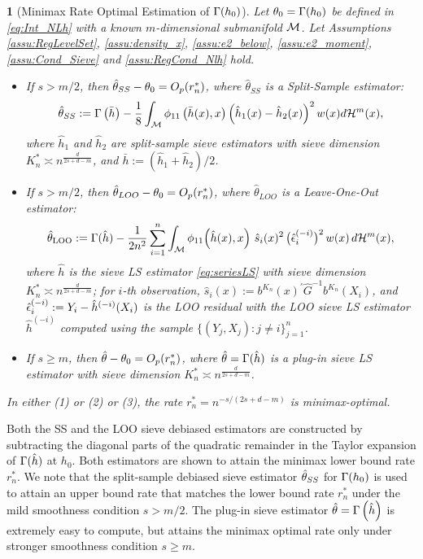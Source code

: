 \documentclass[12pt,american]{article}
\newcommand{\cH}{\mathcal{H}}
\theoremstyle{definition}
\theoremstyle{plain}
\theoremstyle{definition}
\theoremstyle{plain}
\theoremstyle{plain}
\newtheorem{thm}{\protect\theoremname}
\theoremstyle{plain}
\theoremstyle{plain}
\theoremstyle{plain}
\providecommand{\theoremname}{Theorem}
\providecommand{\theoremname}{Theorem}
\begin{document}
\begin{thm}[Minimax Rate Optimal Estimation of $\Gamma(h_0)$]
  \label{thm:Int_NLh_rate} Let $\theta_0=\Gamma(h_0)$ be defined in \eqref{eq:Int_NLh} with a known $m$-dimensional submanifold ${\cal M}$. Let Assumptions \ref{assu:RegLevelSet}, \ref{assu:density_x}, \ref{assu:e2_below}, \ref{assu:e2_moment}, \ref{assu:Cond_Sieve} and \ref{assu:RegCond_Nlh} hold.
  \begin{itemize}
    \item[(1)] If $s > m/2$, then $\hat{\theta}_{SS}-\theta_0=O_p(r_n^*)$, where $\hat{\theta}_{SS}$ is a Split-Sample estimator:
      \begin{align}
        \hat{\theta}_{SS} := \G\left(\bar{h}\right) - \frac{1}{8} \int_{\mathcal{M}} \phi_{11}\left(\bar{h}(x),x\right) \left(\hat{h}_1(x) - \hat{h}_2(x)\right)^2 w(x) d\cH^m(x),
        \label{eq:split_estimator}
      \end{align}
      where $\hat{h}_1$ and $\hat{h}_2$ are split-sample sieve estimators with sieve dimension $K_{n}^{*}\asymp n^{\frac{d}{2s+d-m}}$, and $\bar{h} := (\hat{h}_1 + \hat{h}_2)/2$.
    \item[(2)] If $s > m/2$, then $\hat{\theta}_{LOO}-\theta_0=O_p(r_n^*)$, where $\hat{\theta}_{LOO}$ is a Leave-One-Out estimator:
      \begin{equation}\label{eq:Gamma_LOO_estimator}
        \hat\t_{\mathrm{LOO}}
        := \G(\hat h)
        -\frac{1}{2n^2}\sum_{i=1}^n\int_{\cM}
        \phi_{11}\!\left(\hat h(x),x\right)\,\hat s_i(x)^2\,\big(\hat\e_i^{(-i)}\big)^2\,
        w(x)\,d\cH^m(x),
      \end{equation}
      where $\hat h$ is the sieve LS estimator \eqref{eq:seriesLS} with sieve dimension $K_{n}^{*}\asymp n^{\frac{d}{2s+d-m}}$; for $i$-th observation, $\hat s_i(x):= b^{K_n}(x)^\prime \hat G^{-1} b^{K_n}(X_i)$,
      and $\hat{\epsilon}_i^{(-i)} := Y_i - \hat h^{(-i)}(X_i)$ is the LOO residual with the LOO sieve LS estimator $\hat h^{(-i)}$ computed using the sample $\{(Y_j,X_j):j\neq i\}_{j=1}^n$.
    \item[(3)] If $s\geq m$, then $\hat{\theta}-\theta_0=O_p(r_n^*)$, where $\hat{\theta}=\Gamma(\hat{h})$ is a plug-in sieve LS estimator with sieve dimension $K_{n}^{*}\asymp n^{\frac{d}{2s+d-m}}$.
  \end{itemize}
  In either (1) or (2) or (3), the rate $r_n^*=n^{-s/(2s+d-m)}$ is minimax-optimal.
\end{thm}

Both the SS and the LOO sieve debiased estimators are constructed by subtracting the diagonal parts of the quadratic remainder in the Taylor expansion of $\Gamma(\hat h)$ at $h_0$. Both estimators are shown to attain the minimax lower bound rate $r_n^*$.
We note that the split-sample debiased sieve estimator $\hat{\theta}_{SS}$ for $\Gamma(h_0)$ is used to attain an upper bound rate that matches the lower bound rate $r_n^*$ under the mild smoothness condition $s > m/2$.
The plug-in sieve estimator $\hat{\theta}=\Gamma\left(\hat{h}\right)$ is extremely easy to compute, but attains the minimax optimal rate only under stronger smoothness condition $s\geq m$.
\end{document}
